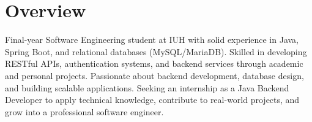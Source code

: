 \section{Overview}

Final-year Software Engineering student at IUH with solid experience in Java, Spring Boot, and
relational databases (MySQL/MariaDB). Skilled in developing RESTful APIs, authentication systems,
and backend services through academic and personal projects. Passionate about backend
development, database design, and building scalable applications. Seeking an internship as a Java
Backend Developer to apply technical knowledge, contribute to real-world projects, and grow into a
professional software engineer.
